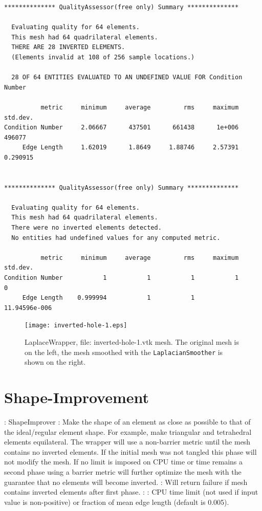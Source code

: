 \begin{verbatim}
************** QualityAssessor(free only) Summary **************

  Evaluating quality for 64 elements.
  This mesh had 64 quadrilateral elements.
  THERE ARE 28 INVERTED ELEMENTS.
  (Elements invalid at 108 of 256 sample locations.)

  28 OF 64 ENTITIES EVALUATED TO AN UNDEFINED VALUE FOR Condition Number

          metric     minimum     average         rms     maximum    std.dev.
Condition Number     2.06667      437501      661438      1e+006      496077
     Edge Length     1.62019      1.8649     1.88746     2.57391    0.290915


************** QualityAssessor(free only) Summary **************

  Evaluating quality for 64 elements.
  This mesh had 64 quadrilateral elements.
  There were no inverted elements detected.
  No entities had undefined values for any computed metric.

          metric     minimum     average         rms     maximum    std.dev.
Condition Number           1           1           1           1           0
     Edge Length    0.999994           1           1           11.94596e-006
\end{verbatim}
\begin{figure}[htbp]
\begin{center}
    \texttt{[image: inverted-hole-1.eps]}
    \caption{LaplaceWrapper, file: inverted-hole-1.vtk mesh. The original mesh is on the left, the mesh smoothed with the \texttt{LaplacianSmoother} is shown on the right.}
    \label{fig:inverted_hole_1}
\end{center}
\end{figure}

\newpage

\section{Shape-Improvement} \label{sec:ShapeImprover}

: ShapeImprover \newline
{}: Make the shape of an element as close as possible to 
that of the ideal/regular element shape. For example, make triangular and 
tetrahedral elements equilateral.  The wrapper will use a non-barrier metric
until the mesh contains no inverted elements.  If the initial mesh was not tangled this phase will not modify the mesh.  If no limit is imposed on CPU
time or time remains a second phase using a barrier metric will further 
optimize the mesh with the guarantee that no elements will become inverted. \newline
{}: Will return failure if mesh contains inverted elements after first phase.\newline
{}:  \newline 
{}: CPU time limit (not used if input 
value is non-positive) or fraction of mean edge length (default is 0.005). \newline \newline

